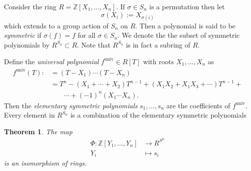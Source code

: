 \documentclass{article}
\newcommand{\Z}{\mathbb{Z}}
\newtheorem{theorem}{Theorem}[section]
\theoremstyle{remark}
\begin{document}
    Consider the ring $R = \Z[X_1,\dots,X_n]$. If $\sigma\in S_n$ is a permutation then let
    $$
        \sigma(X_i):= X_{\sigma(i)}
    $$
    which extends to a group action of $S_n$ on $R$. 
    Then a polynomial is said to be \textit{symmetric} if $\sigma(f)=f$ for all $\sigma\in S_n$. 
    We denote the the subset of symmetric polynomials by $R^{S_n}\subset R$.
    Note that $R^{S_n}$ is in fact a subring of $R$.

    Define the \textit{universal polynomial} $f^{\text{univ}}\in R[T]$ with roots $X_1,\dots, X_n$ as
    \begin{align*}
        f^{\text{univ}}(T):&=(T-X_1)\cdots(T-X_n)\\&=T^n-(X_1+\cdots+X_2)T^{n-1}+(X_1X_2+X_1X_3+\cdots)T^{n-1}+\\&\qquad\cdots+(-1)^n(X_1\cdots X_n).
    \end{align*}
    Then the \textit{elementary symmetric polynomials} $s_1,\dots,s_n$ are the coefficients of $f^{\text{univ}}$. Every element in $R^{S_n}$ is a combination of the elementary symmetric polynomials
    \begin{theorem}
        The map
        \begin{align*}
            \Phi:\Z[Y_1,\dots,Y_n]&\to R^{S^n}\\
            Y_i&\mapsto s_i
        \end{align*}
        is an isomorphism of rings.
    \end{theorem}
\end{document}
